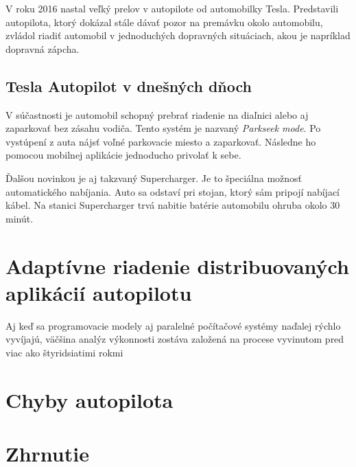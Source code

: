 \documentclass[10pt,twoside,slovak,a4paper]{article}
\begin{document}
V roku 2016 nastal veľký prelov v autopilote od automobilky Tesla. Predstavili autopilota, ktorý dokázal stále dávať pozor na premávku okolo automobilu, zvládol riadiť automobil v jednoduchých dopravných situáciach, akou je napríklad dopravná zápcha. \cite{TeslaAutopilot}

\subsection{Tesla Autopilot v dnešných dňoch}

V súčastnosti je automobil schopný prebrať riadenie na diaľnici alebo aj zaparkovať bez zásahu vodiča. Tento systém je nazvaný \emph{Parkseek mode}. Po vystúpení z auta nájsť voľné parkovacie miesto a zaparkovať. Následne ho pomocou mobilnej aplikácie jednoducho privolať k sebe. 

Ďalšou novinkou je aj takzvaný Supercharger. Je to špeciálna možnosť automatického nabíjania. Auto sa odstaví pri stojan, ktorý sám pripojí nabíjací kábel. Na stanici Supercharger trvá nabitie batérie automobilu ohruba okolo 30 minút. \cite{TeslaAutopilot}

\section{Adaptívne riadenie distribuovaných aplikácií autopilotu} \label{ARDAA}

Aj keď sa programovacie modely aj paralelné počítačové systémy naďalej rýchlo vyvíjajú, väčšina analýz výkonnosti zostáva založená na procese vyvinutom pred viac ako štyridsiatimi rokmi


\section{Chyby autopilota} \label{chyby}
\section{Zhrnutie}


 
\end{document}
